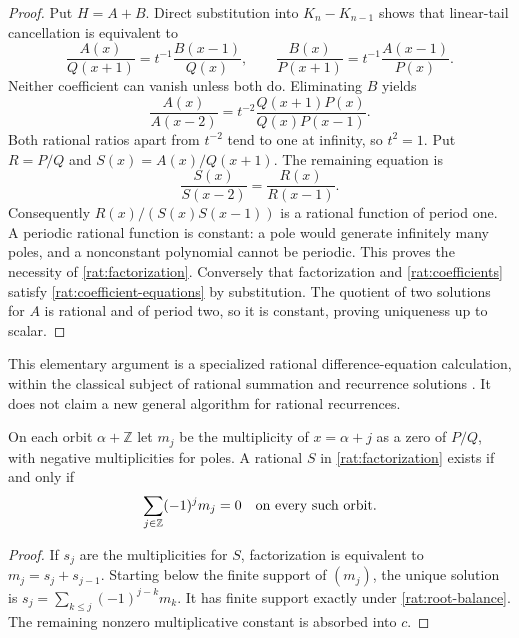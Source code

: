 \begin{proof}
Put $H=A+B$. Direct substitution into $K_n-K_{n-1}$ shows that
linear-tail cancellation is equivalent to
\begin{equation}\label{rat:coefficient-equations}
 \frac{A(x)}{Q(x+1)}=t^{-1}\frac{B(x-1)}{Q(x)},\qquad
 \frac{B(x)}{P(x+1)}=t^{-1}\frac{A(x-1)}{P(x)}.
\end{equation}
Neither coefficient can vanish unless both do. Eliminating $B$ yields
\[
 \frac{A(x)}{A(x-2)}=
 t^{-2}\frac{Q(x+1)P(x)}{Q(x)P(x-1)}.
\]
Both rational ratios apart from $t^{-2}$ tend to one at infinity,
so $t^2=1$. Put $R=P/Q$ and $S(x)=A(x)/Q(x+1)$. The remaining
equation is
\[
 \frac{S(x)}{S(x-2)}=\frac{R(x)}{R(x-1)}.
\]
Consequently $R(x)/(S(x)S(x-1))$ is a rational function of period
one. A periodic rational function is constant: a pole would generate
infinitely many poles, and a nonconstant polynomial cannot be
periodic. This proves the necessity of \eqref{rat:factorization}.
Conversely that factorization and \eqref{rat:coefficients} satisfy
\eqref{rat:coefficient-equations} by substitution. The quotient of
two solutions for $A$ is rational and of period two, so it is
constant, proving uniqueness up to scalar.
\end{proof}

This elementary argument is a specialized rational difference-equation
calculation, within the classical subject of rational summation and
recurrence solutions \cite{rat:Abramov}. It does not claim a new general
algorithm for rational recurrences.

\begin{corollary}\label{rat:root-orbits}
On each orbit $\alpha+\mathbb Z$ let $m_j$ be the multiplicity of
$x=\alpha+j$ as a zero of $P/Q$, with negative multiplicities for
poles. A rational $S$ in \eqref{rat:factorization} exists if and only if
\begin{equation}\label{rat:root-balance}
 \sum_{j\in\mathbb Z}(-1)^jm_j=0
 \quad\hbox{on every such orbit}.
\end{equation}
\end{corollary}
\begin{proof}
If $s_j$ are the multiplicities for $S$, factorization is equivalent
to $m_j=s_j+s_{j-1}$. Starting below the finite support of $(m_j)$,
the unique solution is
$s_j=\sum_{k\le j}(-1)^{j-k}m_k$. It has finite support exactly
under \eqref{rat:root-balance}. The remaining nonzero multiplicative
constant is absorbed into $c$.
\end{proof}

